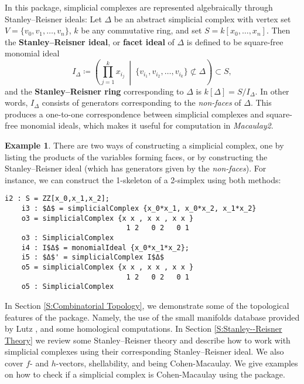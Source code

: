 \documentclass[12pt,leqno]{amsart}
\theoremstyle{definition}
\newtheorem{example}[lemma]{Example}
\begin{document}
In this package, simplicial complexes are represented algebraically through
Stanley--Reisner ideals: Let $\Delta$ be an abstract simplicial complex with
vertex set $V = \{v_0,v_1,\dotsc,v_n\}$, $k$ be any commutative ring, and set
$S = k[x_0,\dotsc,x_n]$. Then the \textbf{Stanley--Reisner ideal}, or
\textbf{facet ideal} of $\Delta$ is defined to be square-free monomial ideal
%
\[
  I_\Delta \coloneq \left( \prod_{j=1}^k x_{i_j} \ \middle| \ \{
    v_{i_1},v_{i_2},\dotsc,v_{i_k} \} \not \subset \Delta \right) \subset S,
\]
%
and the \textbf{Stanley--Reisner ring} corresponding to $\Delta$ is
$k[\Delta] = S/I_\Delta$. In other words, $I_\Delta$ consists of generators
corresponding to the \textit{non-faces} of $\Delta$. This produces a
one-to-one correspondence between simplicial complexes and square-free
monomial ideals, which makes it useful for computation in \textit{Macaulay2}.

\begin{example}\label{example of using database}
  There are two ways of constructing a simplicial complex, one by listing the
  products of the variables forming faces, or by constructing the
  Stanley--Reisner ideal (which has generators given by the
  \textit{non-faces}). For instance, we can construct the 1-skeleton of a
  2-simplex using both methods:
  \begin{lstlisting}[basicstyle={\ttfamily \scriptsize}, xleftmargin=-23pt]
    i2 : S = ZZ[x_0,x_1,x_2];
    i3 : $Δ$ = simplicialComplex {x_0*x_1, x_0*x_2, x_1*x_2}
    o3 = simplicialComplex {x x , x x , x x }
                             1 2   0 2   0 1
    o3 : SimplicialComplex
    i4 : I$Δ$ = monomialIdeal {x_0*x_1*x_2};
    i5 : $Δ$' = simplicialComplex I$Δ$
    o5 = simplicialComplex {x x , x x , x x }
                             1 2   0 2   0 1
    o5 : SimplicialComplex
  \end{lstlisting}
\end{example}

In Section \ref{S:Combinatorial Topology}, we demonstrate some of the
topological features of the package. Namely, the use of the small manifolds
database provided by Lutz \cite{LutzM}, and some homological computations. In
Section \ref{S:Stanley--Reisner Theory} we review some Stanley--Reisner theory
and describe how to work with simplicial complexes using their corresponding
Stanley--Reisner ideal. We also cover $f$- and $h$-vectors, shellability, and
being Cohen-Macaulay. We give examples on how to check if a simplicial complex
is Cohen-Macaulay using the package.
\end{document}
